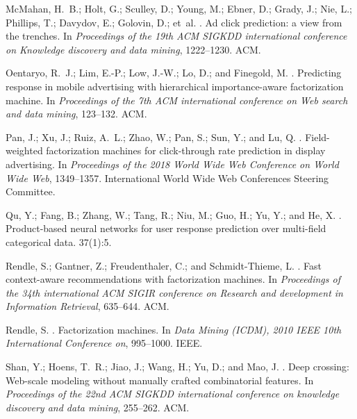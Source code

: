 \documentclass[sigconf]{acmart}
\begin{document}
\begin{thebibliography}{10}
McMahan, H.~B.; Holt, G.; Sculley, D.; Young, M.; Ebner, D.; Grady, J.; Nie,
  L.; Phillips, T.; Davydov, E.; Golovin, D.; et~al.
.
\newblock Ad click prediction: a view from the trenches.
\newblock In {\em Proceedings of the 19th ACM SIGKDD international conference
  on Knowledge discovery and data mining},  1222--1230.
\newblock ACM.

Oentaryo, R.~J.; Lim, E.-P.; Low, J.-W.; Lo, D.; and Finegold, M.
.
\newblock Predicting response in mobile advertising with hierarchical
  importance-aware factorization machine.
\newblock In {\em Proceedings of the 7th ACM international conference on Web
  search and data mining},  123--132.
\newblock ACM.

Pan, J.; Xu, J.; Ruiz, A.~L.; Zhao, W.; Pan, S.; Sun, Y.; and Lu, Q.
.
\newblock Field-weighted factorization machines for click-through rate
  prediction in display advertising.
\newblock In {\em Proceedings of the 2018 World Wide Web Conference on World
  Wide Web},  1349--1357.
\newblock International World Wide Web Conferences Steering Committee.

Qu, Y.; Fang, B.; Zhang, W.; Tang, R.; Niu, M.; Guo, H.; Yu, Y.; and He, X.
.
\newblock Product-based neural networks for user response prediction over
  multi-field categorical data.
 37(1):5.

Rendle, S.; Gantner, Z.; Freudenthaler, C.; and Schmidt-Thieme, L.
.
\newblock Fast context-aware recommendations with factorization machines.
\newblock In {\em Proceedings of the 34th international ACM SIGIR conference on
  Research and development in Information Retrieval},  635--644.
\newblock ACM.

Rendle, S.
.
\newblock Factorization machines.
\newblock In {\em Data Mining (ICDM), 2010 IEEE 10th International Conference
  on},  995--1000.
\newblock IEEE.

Shan, Y.; Hoens, T.~R.; Jiao, J.; Wang, H.; Yu, D.; and Mao, J.
.
\newblock Deep crossing: Web-scale modeling without manually crafted
  combinatorial features.
\newblock In {\em Proceedings of the 22nd ACM SIGKDD international conference
  on knowledge discovery and data mining},  255--262.
\newblock ACM.


\end{thebibliography}
\end{document}
